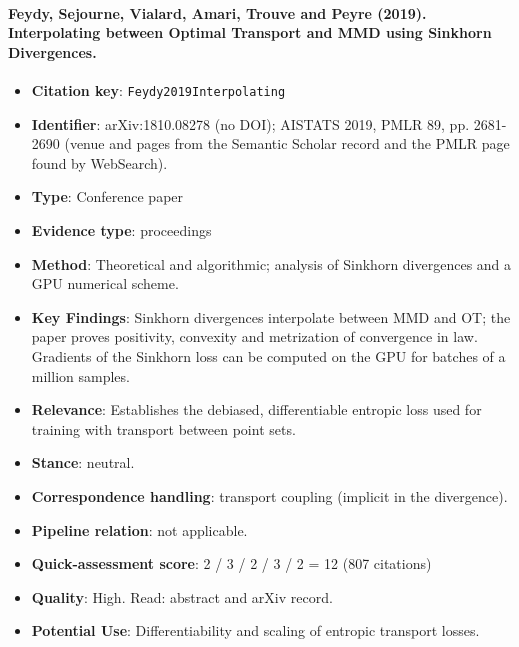 \documentclass[journal,onecolumn]{IEEEtran}
\begin{document}
\paragraph{Feydy, Sejourne, Vialard, Amari, Trouve and Peyre (2019). Interpolating between Optimal Transport and MMD using Sinkhorn Divergences.~\cite{Feydy2019Interpolating}}\mbox{}

\begin{itemize}

\item{} \textbf{Citation key}: \texttt{Feydy2019Interpolating}

\item{} \textbf{Identifier}: arXiv:1810.08278 (no DOI); AISTATS 2019, PMLR 89, pp. 2681-2690 (venue and pages from the Semantic Scholar record and the PMLR page found by WebSearch).

\item{} \textbf{Type}: Conference paper

\item{} \textbf{Evidence type}: proceedings

\item{} \textbf{Method}: Theoretical and algorithmic; analysis of Sinkhorn divergences and a GPU numerical scheme.

\item{} \textbf{Key Findings}: Sinkhorn divergences interpolate between MMD and OT; the paper proves positivity, convexity and metrization of convergence in law. Gradients of the Sinkhorn loss can be computed on the GPU for batches of a million samples.

\item{} \textbf{Relevance}: Establishes the debiased, differentiable entropic loss used for training with transport between point sets.

\item{} \textbf{Stance}: neutral.

\item{} \textbf{Correspondence handling}: transport coupling (implicit in the divergence).

\item{} \textbf{Pipeline relation}: not applicable.

\item{} \textbf{Quick-assessment score}: 2 / 3 / 2 / 3 / 2 = 12 (807 citations)

\item{} \textbf{Quality}: High. Read: abstract and arXiv record.

\item{} \textbf{Potential Use}: Differentiability and scaling of entropic transport losses.

\end{itemize}
\end{document}
